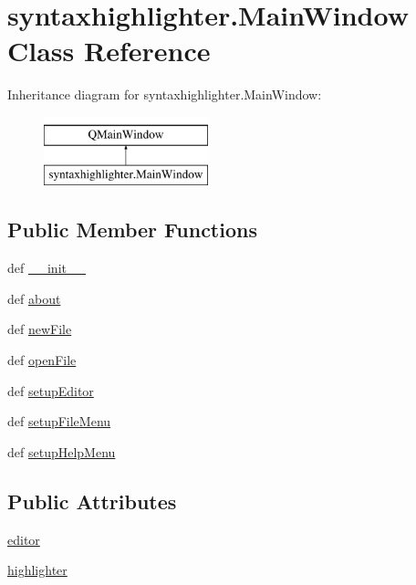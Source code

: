 \hypertarget{classsyntaxhighlighter_1_1MainWindow}{}\section{syntaxhighlighter.\+Main\+Window Class Reference}
\label{classsyntaxhighlighter_1_1MainWindow}
Inheritance diagram for syntaxhighlighter.\+Main\+Window\+:\begin{figure}[H]
\begin{center}
\leavevmode
\includegraphics[height=2.000000cm]{classsyntaxhighlighter_1_1MainWindow}
\end{center}
\end{figure}
\subsection*{Public Member Functions}
\begin{DoxyCompactItemize}
\item 
def \hyperlink{classsyntaxhighlighter_1_1MainWindow_a7e4f82665de142eddae2b8367e78e23c}{\+\_\+\+\_\+init\+\_\+\+\_\+}
\item 
def \hyperlink{classsyntaxhighlighter_1_1MainWindow_aa73e9fbf7da139d9c28ff10f2c5089e5}{about}
\item 
def \hyperlink{classsyntaxhighlighter_1_1MainWindow_a1bd7fc4b74f6d7c3bea0f7f99b96e3ae}{new\+File}
\item 
def \hyperlink{classsyntaxhighlighter_1_1MainWindow_a474bace48b548954ad79764f9f2ee52f}{open\+File}
\item 
def \hyperlink{classsyntaxhighlighter_1_1MainWindow_a5ee4fbbcc8bcfaa20ae29fb0d23b88dc}{setup\+Editor}
\item 
def \hyperlink{classsyntaxhighlighter_1_1MainWindow_a0957b88b6a50b4e9c3bdaeb5a7e8a3fc}{setup\+File\+Menu}
\item 
def \hyperlink{classsyntaxhighlighter_1_1MainWindow_a15c8180158e91b59a1fb1fc16638d41e}{setup\+Help\+Menu}
\end{DoxyCompactItemize}
\subsection*{Public Attributes}
\begin{DoxyCompactItemize}
\item 
\hyperlink{classsyntaxhighlighter_1_1MainWindow_aadc535fd1c2582173143fa533f5ea120}{editor}
\item 
\hyperlink{classsyntaxhighlighter_1_1MainWindow_a88468d7a8d07946ca81d3552b95a906c}{highlighter}
\end{DoxyCompactItemize}


